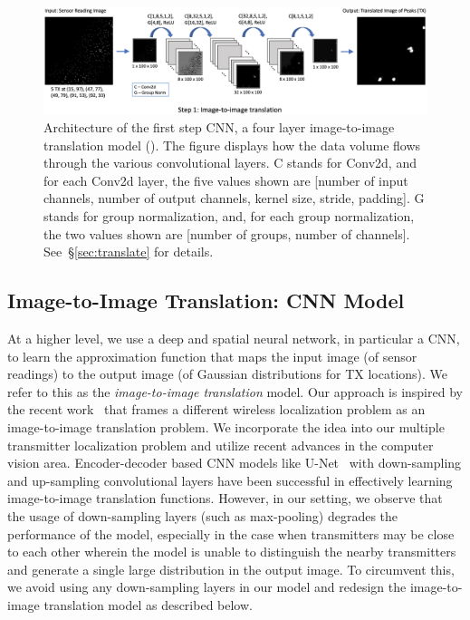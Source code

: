 \begin{figure}
    \centering
    \includegraphics[width=\textwidth]{chapters/wowmom-pmc/figures/part1.png}
    \caption{Architecture of the first step CNN, a four layer image-to-image translation model (\imgimg). The figure displays how the data volume flows through the various convolutional layers. C stands for Conv2d, and for each Conv2d layer, the five values shown are [number of input channels, number of output channels, kernel size, stride, padding]. G stands for group normalization, and, for each group normalization, the two values shown are [number of groups, number of channels]. See~\S\ref{sec:translate} for details.}
    \label{fig:part1}
\end{figure}


\subsection{Image-to-Image Translation: \imgimg CNN Model}
\label{subsec:img-translate}

At a higher level, we use a deep and spatial neural network, in particular a CNN, to learn the
approximation function that maps the input image (of sensor readings) to the output image (of Gaussian distributions for TX locations). We refer to this as the {\em image-to-image translation}
model. Our approach is inspired by the recent work~\cite{mobicom20-deeploc} that frames 
a different wireless localization problem as an image-to-image translation problem.
We incorporate the idea into our multiple transmitter localization problem and utilize recent advances in the computer vision area. 
Encoder-decoder based CNN models like U-Net~\cite{miccai15-unet} with down-sampling
and up-sampling convolutional layers have been successful in effectively learning image-to-image translation functions. However, in our setting, we observe that the usage of down-sampling layers (such as max-pooling) degrades the performance of the model, especially in the case when transmitters may be close to each other wherein the model is unable to distinguish the nearby transmitters and generate a single large distribution in the output image. To circumvent this, we avoid using any
down-sampling layers in our model and redesign the image-to-image translation model as described below.

